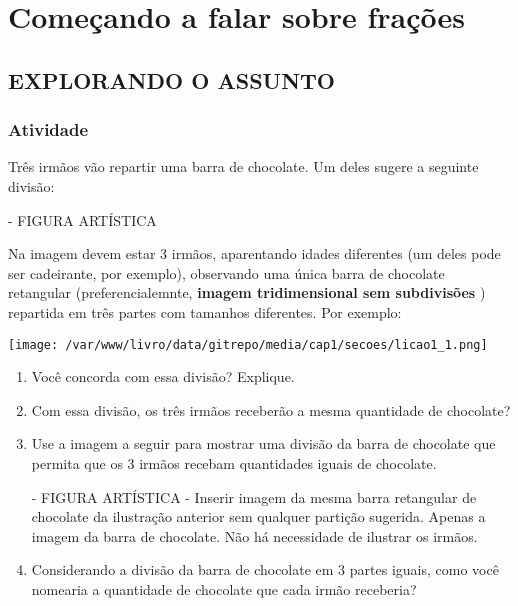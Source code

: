 \documentclass[a4,12pt]{book}
\begin{document}
\chapter{Começando a falar sobre frações }

\section*{EXPLORANDO O ASSUNTO }

\subsection{Atividade}

Três irmãos vão repartir uma barra de chocolate. Um deles sugere a seguinte divisão: 

\begin{imagem*}[breakable]{}{}   - FIGURA ARTÍSTICA   
  
Na imagem devem estar 3 irmãos, aparentando idades diferentes (um deles pode ser cadeirante, por exemplo), observando uma única barra de chocolate retangular (preferencialemnte,   {\bf imagem tridimensional sem subdivisões}  ) repartida em três partes com tamanhos diferentes. Por exemplo:  
  
    \texttt{[image: /var/www/livro/data/gitrepo/media/cap1/secoes/licao1\_1.png]}  
  
\end{imagem*}

\begin{enumerate} [\quad a)] %
  \item     Você concorda com essa divisão? Explique.
  \item     Com essa divisão, os três irmãos receberão a mesma quantidade de chocolate?
  \item     Use a imagem a seguir para mostrar uma divisão da barra de chocolate que permita que os 3 irmãos recebam quantidades iguais de chocolate. 
\begin{imagem*}[breakable]{}{}    - FIGURA ARTÍSTICA - Inserir imagem da mesma barra retangular de chocolate da ilustração anterior sem qualquer partição sugerida. Apenas a imagem da barra de chocolate. Não há necessidade de ilustrar os irmãos.\end{imagem*}
  \item     Considerando a divisão da barra de chocolate em 3 partes iguais, como você nomearia a quantidade de chocolate que cada irmão receberia? 
\end{enumerate} %
\end{document}

